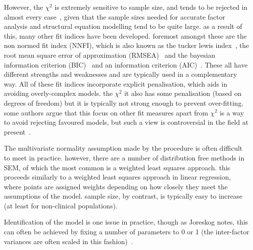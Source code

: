 However, the $\chi^2$ is extremely sensitive to sample size, and tends to be rejected in almost every case~\cite{henson2006use}, given that the sample sizes needed for accurate factor analysis and structural equation modelling tend to be quite large. as a result of this, many other fit indices have been developed. foremost amongst these are the non normed fit index (NNFI), which is also known as the tucker lewis index~\cite{bentler1990comparative}, the root mean square error of approximation (RMSEA)~\cite{rigdon1996cfi} and the bayesian information criterion (BIC)~\cite{schwarz1978estimating} and an information criterion (AIC)~\cite{akaike1974new}. These all have different strengths and weaknesses and are typically used in a complementary way. All of these fit indices incorporate explicit penalisation, which aids in avoiding overly-complex models. the $\chi^2$ it also has some penalisation (based on degrees of freedom) but it is typically not strong enough to prevent over-fitting. some authors argue that this focus on other fit measures apart from $\chi^2$ is a way to avoid rejecting favoured models, but such a view is controversial in the field at present~\cite{barrett2007structural}.


The multivariate normality assumption made by the procedure is often difficult to meet in practice. however, there are a number of distribution free methods in SEM, of which the most common is a weighted least squares approach. this proceeds similarly to a weighted least squares approach in linear regression, where points are assigned weights depending on how closely they meet the assumptions of the model. sample size, by contrast, is typically easy to increase (at least for non-clinical populations).

Identification of the model is one issue in practice, though as Joreskog notes, this can often be achieved by fixing a number of parameters to 0 or 1 (the inter-factor variances are often scaled in this fashion)~\cite{joreskog1978structural}.

